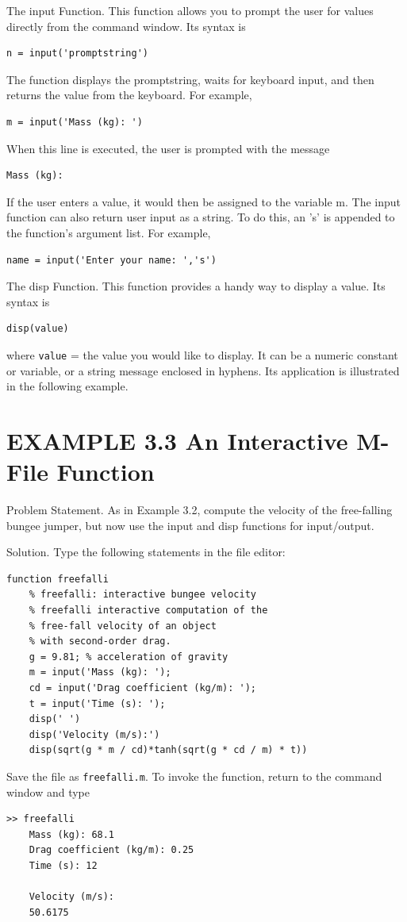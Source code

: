 \documentclass[../main.tex]{subfiles}
\begin{document}
 The input Function. This function allows you to prompt the user for values directly
from the command window. Its syntax is
\begin{lstlisting}[frame=none, numbers=none]
    n = input('promptstring')
\end{lstlisting}
The function displays the promptstring, waits for keyboard input, and then returns the
value from the keyboard. For example,
\begin{lstlisting}[frame=none, numbers=none]
    m = input('Mass (kg): ')
\end{lstlisting}
When this line is executed, the user is prompted with the message
\begin{lstlisting}[frame=none, numbers=none]
    Mass (kg):
\end{lstlisting}
If the user enters a value, it would then be assigned to the variable m.
The input function can also return user input as a string. To do this, an 's' is appended to the function's argument list. For example,
\begin{lstlisting}[frame=none, numbers=none]
    name = input('Enter your name: ','s')
\end{lstlisting}
The disp Function. This function provides a handy way to display a value. Its syntax is
\begin{lstlisting}[frame=none, numbers=none]
    disp(value)
\end{lstlisting}
where \texttt{value} = the value you would like to display. It can be a numeric constant or variable, or a string message enclosed in hyphens. Its application is illustrated in the following
example. 

\section*{EXAMPLE 3.3 An Interactive M-File Function}

Problem Statement. As in Example 3.2, compute the velocity of the free-falling bungee
jumper, but now use the input and disp functions for input/output.


Solution. Type the following statements in the file editor:
\begin{lstlisting}[frame=none, numbers=none]
    function freefalli
    % freefalli: interactive bungee velocity
    % freefalli interactive computation of the
    % free-fall velocity of an object
    % with second-order drag.
    g = 9.81; % acceleration of gravity
    m = input('Mass (kg): ');
    cd = input('Drag coefficient (kg/m): ');
    t = input('Time (s): ');
    disp(' ')
    disp('Velocity (m/s):')
    disp(sqrt(g * m / cd)*tanh(sqrt(g * cd / m) * t))
\end{lstlisting}
Save the file as \texttt{freefalli.m}. To invoke the function, return to the command window and
type
\begin{lstlisting}[frame=none, numbers=none]
    >> freefalli
    Mass (kg): 68.1
    Drag coefficient (kg/m): 0.25
    Time (s): 12

    Velocity (m/s):
    50.6175
\end{lstlisting}
\end{document}
